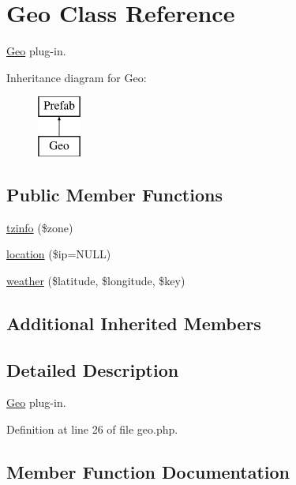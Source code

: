\hypertarget{class_web_1_1_geo}{}\section{Geo Class Reference}
\label{class_web_1_1_geo}


\hyperlink{class_web_1_1_geo}{Geo} plug-\/in.  


Inheritance diagram for Geo\+:\begin{figure}[H]
\begin{center}
\leavevmode
\includegraphics[height=2.000000cm]{class_web_1_1_geo}
\end{center}
\end{figure}
\subsection*{Public Member Functions}
\begin{DoxyCompactItemize}
\item 
\hyperlink{class_web_1_1_geo_a81cf6bb2edc32c23fb528d32adaac50c}{tzinfo} (\$zone)
\item 
\hyperlink{class_web_1_1_geo_ac49b9e92ee8c7a99f780dcf32d50a588}{location} (\$ip=N\+U\+LL)
\item 
\hyperlink{class_web_1_1_geo_a258565515125ab61c663b70102946129}{weather} (\$latitude, \$longitude, \$key)
\end{DoxyCompactItemize}
\subsection*{Additional Inherited Members}


\subsection{Detailed Description}
\hyperlink{class_web_1_1_geo}{Geo} plug-\/in. 

Definition at line 26 of file geo.\+php.



\subsection{Member Function Documentation}
\hypertarget{class_web_1_1_geo_ac49b9e92ee8c7a99f780dcf32d50a588}{}\label{class_web_1_1_geo_ac49b9e92ee8c7a99f780dcf32d50a588} 
